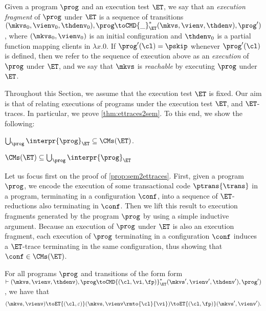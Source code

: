 \label{sec:normal-form-exist}
Given a program $\prog$ and an execution test $\ET$, we say that an \emph{execution fragment} of 
$\prog$ under $\ET$ is a sequence of transitions 
$(\mkvs_{0}, \vienv_{0}, \thdenv_{0} ), \prog \toCMD{\_}_{\ET}^{\ast} ( \mkvs, \vienv, \thdenv ) , \prog' )$, 
where $(\mkvs_{0}, \vienv_{0})$ is an initial configuration and $\thdenv_{0}$ is a partial function mapping 
clients in $\lambda x. 0$. If $\prog'(\cl) = \pskip$ whenever $\prog'(\cl)$ is defined, then 
we refer to the sequence of execution above as an \emph{execution} of $\prog$ under $\ET$, and 
we say that $\mkvs$ is \emph{reachable} by executing $\prog$ under $\ET$.

Throughout this Section, we assume that the execution test $\ET$ is fixed. 
Our aim is that of relating  executions of programs under the execution test $\ET$, and $\ET$-traces. 
In particular, we prove  \cref{thm:ettraces2sem}. To this end, we show the following: 

\begin{proposition}
\label{prop:sem2ettraces}
$\bigcup_{\prog} \interpr{\prog}_{\ET} \subseteq \CMs(\ET)$.
\end{proposition}

\begin{proposition}
\label{prop:ettraces2sem}
$\CMs(\ET) \subseteq \bigcup_{\prog} \interpr{\prog}_{\ET}$
\end{proposition}

Let us focus first on the proof of \cref{prop:sem2ettraces}. First, given a program $\prog$, 
we encode the execution of some transactional code $\ptrans{\trans}$ in a program, 
terminating in a configuration $\conf$, into a sequence of $\ET$-reductions also terminating 
in $\conf$. Then we lift this result to execution fragments generated by the program $\prog$ by using 
a simple inductive argument. Because an execution of $\prog$ under $\ET$ is also an execution fragment, 
each execution of $\prog$ terminating in a configuration $\conf$ induces a $\ET$-trace terminating in 
the same configuration, thus showing that $\conf \in \CMs(\ET)$.

\begin{lemma}
\label{lem:sem2ettrace}
For all programs $\prog$ and transitions of the form 
form $\vdash (\mkvs, \vienv, \thdenv ), \prog \toCMD{(\cl, \vi, \fp)}_{\ET}^{\ast} ( \mkvs', \vienv', \thdenv' ) , \prog' )$,  
we have that  
\[
(\mkvs, \vienv) \toET{(\cl, \varepsilon)} (\mkvs, \vienv\rmto{\cl}{\vi}) \toET{(\cl, \fp)} (\mkvs', \vienv').
\]
\end{lemma}

